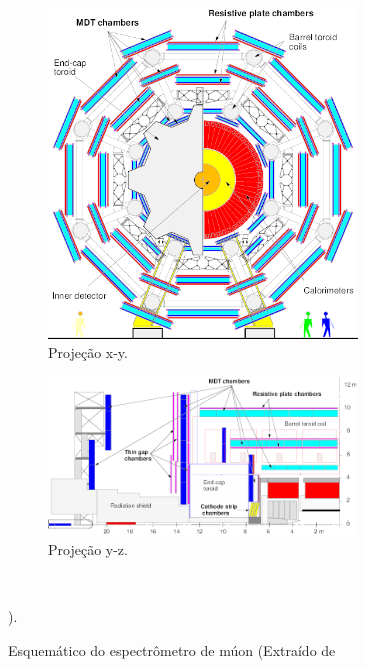 \begin{figure}[htpb!]
    \centering
    \begin{subfigure}[b]{\textwidth}
        \centering
        \includegraphics[width=0.9\textwidth]{images/ATLAS-muon-xy-tdr.png}
        \caption{Projeção x-y.}
        \label{fig:muonspecxy}
    \end{subfigure}
    \begin{subfigure}[b]{\textwidth}
        \centering
        \includegraphics[width=0.9\textwidth]{images/ATLAS-muon-rz-tdr.png}
        \caption{Projeção y-z.}
        \label{fig:muonspecyz}
    \end{subfigure}~\\%
    \caption[Visualização gráfica do Espectrômetro de múons.]{Esquemático do
    espectrômetro de múon (Extraído de~\cite{MUONTDR1997}}).
    \label{fig:muonspec}
\end{figure}

